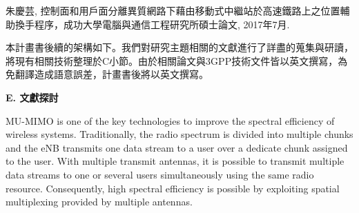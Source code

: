 \documentclass[a4paper,12pt]{article}%
\begin{document}
\noindent [R1] 朱慶芸, 控制面和用戶面分離異質網路下藉由移動式中繼站於高速鐵路上之位置輔助換手程序，成功大學電腦與通信工程研究所碩士論文, 2017年7月.

本計畫書後續的架構如下。我們對研究主題相關的文獻進行了詳盡的蒐集與研讀，將現有相關技術整理於C小節。由於相關論文與3GPP技術文件皆以英文撰寫，為免翻譯造成語意誤差，計畫書後將以英文撰寫。






\noindent \textbf{E. 文獻探討}

MU-MIMO is one of the key technologies to improve the spectral efficiency of wireless systems. Traditionally, the radio spectrum is divided into multiple chunks and the eNB transmits one data stream to a user over a dedicate chunk assigned to the user. With multiple transmit antennas, it is possible to transmit multiple data streams to one or several users simultaneously using the same radio resource. Consequently, high spectral efficiency is possible by exploiting spatial multiplexing provided by multiple antennas.
\end{document}
